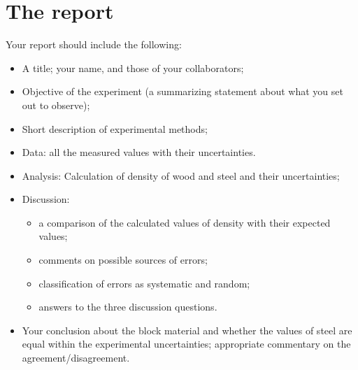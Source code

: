 \section{The report}
Your report should include the following:
\begin{itemize}
\item
A title; your name, and those of your collaborators;
\item
Objective of the experiment (a summarizing statement about what you set out to observe);
\item Short description of experimental methods;
\item
Data: all the measured values with their uncertainties.
\item
Analysis: Calculation of density of wood and steel and their uncertainties;
\item
Discussion: 
\begin{itemize}
\item a comparison of the calculated values of density with their expected values;
\item comments on possible sources of errors;
\item classification of errors as systematic and random;
\item answers to the three discussion questions.
\end{itemize}
\item
Your conclusion about the block material and whether the values of steel are equal within the experimental uncertainties; appropriate commentary on the agreement/disagreement.
\end{itemize}

\AtEndDocument{\clearpage\ifodd\value{page}\else\null\clearpage\fi} %




